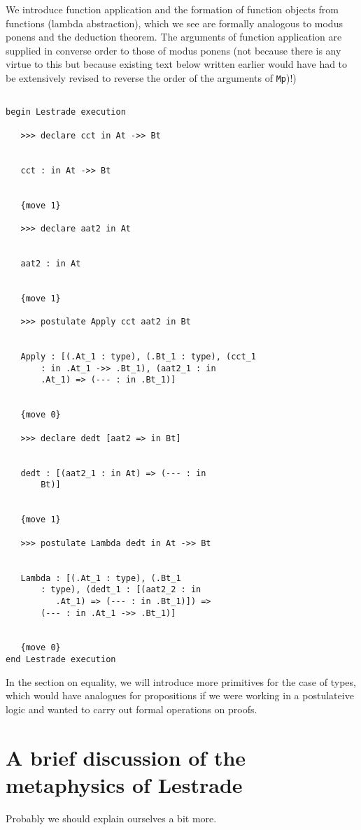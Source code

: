 \documentclass[12pt]{article}
\begin{document}
We introduce function application and the formation of function objects from functions (lambda abstraction), which we see are formally analogous to modus ponens and the deduction theorem.  The arguments of function application are supplied in converse order to those of modus ponens (not because there is any virtue to this but because existing text below written earlier would have had to be extensively revised to reverse the order of the arguments of {\tt Mp})!)

\begin{verbatim}

begin Lestrade execution

   >>> declare cct in At ->> Bt


   cct : in At ->> Bt


   {move 1}

   >>> declare aat2 in At


   aat2 : in At


   {move 1}

   >>> postulate Apply cct aat2 in Bt


   Apply : [(.At_1 : type), (.Bt_1 : type), (cct_1 
       : in .At_1 ->> .Bt_1), (aat2_1 : in 
       .At_1) => (--- : in .Bt_1)]


   {move 0}

   >>> declare dedt [aat2 => in Bt]


   dedt : [(aat2_1 : in At) => (--- : in 
       Bt)]


   {move 1}

   >>> postulate Lambda dedt in At ->> Bt


   Lambda : [(.At_1 : type), (.Bt_1 
       : type), (dedt_1 : [(aat2_2 : in 
          .At_1) => (--- : in .Bt_1)]) => 
       (--- : in .At_1 ->> .Bt_1)]


   {move 0}
end Lestrade execution
\end{verbatim}

In the section on equality, we will introduce more primitives for the case of types, which would have analogues for propositions if we were working in a postulateive logic and wanted to carry out formal operations on proofs.

\newpage

\section{A brief discussion of the metaphysics of Lestrade}

Probably we should explain ourselves a bit more.
\end{document}
